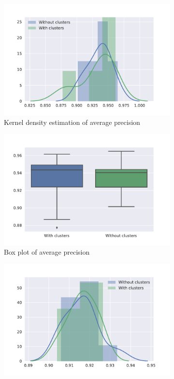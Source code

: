 \begin{figure}[htb]
\begin{subfigure}[b]{0.49\textwidth}
	\centering
    \includegraphics[width=\textwidth]{figures/results/datasize/200pos_10fold_default_kde_ap.pdf}
    \caption{Kernel density estimation of average precision}
  \end{subfigure}
  \begin{subfigure}[b]{0.49\textwidth}
	\centering
    \includegraphics[width=\textwidth]{figures/results/datasize/200pos_10fold_default_boxplot_ap.pdf}
    \caption{Box plot of average precision}
  \end{subfigure}
  \begin{subfigure}[b]{0.49\textwidth}
	\centering
    \includegraphics[width=\textwidth]{figures/results/datasize/200pos_10fold_default_kde_f1.pdf}

\end{subfigure}
\end{figure}

